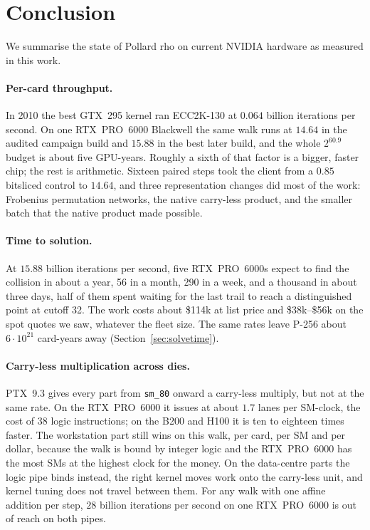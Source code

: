\section{Conclusion}
\label{sec:conclusion}

We summarise the state of Pollard rho on current NVIDIA hardware as
measured in this work.

\paragraph{Per-card throughput.} In 2010 the
best GTX~295 kernel ran ECC2K-130 at $0.064$ billion iterations per
second. On one RTX~PRO~6000 Blackwell the same walk runs at $14.64$ in
the audited campaign build and $15.88$ in the best later build, and the
whole $2^{60.9}$ budget is about five GPU-years. Roughly a sixth of that
factor is a bigger, faster chip; the rest is arithmetic. Sixteen paired
steps took the client from a $0.85$ bitsliced control to $14.64$, and
three representation changes did most of the work: Frobenius
permutation networks, the native carry-less product, and the smaller
batch that the native product made possible.

\paragraph{Time to solution.} At $15.88$ billion
iterations per second, five RTX~PRO~6000s expect to find the collision
in about a year, 56 in a month, 290 in a week, and a thousand in about
three days, half of them spent waiting for the last trail to reach a
distinguished point at cutoff 32. The work costs about \$114k at list
price and \$38k--\$56k on the spot quotes we saw, whatever the fleet
size. The same rates leave P-256 about $6\cdot10^{21}$ card-years away
(Section~\ref{sec:solvetime}).

\paragraph{Carry-less multiplication across dies.}
PTX~9.3 gives every part from \texttt{sm\_80} onward a carry-less
multiply, but not at the same rate. On the RTX~PRO~6000 it issues at
about $1.7$ lanes per SM-clock, the cost of $38$ logic instructions; on
the B200 and H100 it is ten to eighteen times faster. The workstation
part still wins on this walk, per card, per SM and per dollar, because
the walk is bound by integer logic and the RTX~PRO~6000 has the most
SMs at the highest clock for the money. On the data-centre parts the
logic pipe binds instead, the right kernel moves work onto the
carry-less unit, and kernel tuning does not travel between them. For
any walk with one affine addition per step, $28$ billion iterations per
second on one RTX~PRO~6000 is out of reach on both pipes.

